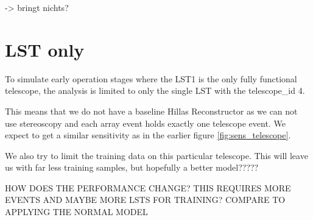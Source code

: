 -> bringt nichts?


\section{LST only}
To simulate early operation stages where the LST1 is the only fully functional 
telescope, the analysis is limited to only the single LST with 
the telescope\_id 4.

This means that we do not have a baseline Hillas Reconstructor as we can not use
stereoscopy and each array event holds exactly one telescope event.
We expect to
get a similar sensitivity as in the earlier figure \ref{fig:sens_telescope}.

We also try to limit the training data on this particular telescope.
This will leave us with far less training samples, but hopefully
a better model?????

HOW DOES THE PERFORMANCE CHANGE?
THIS REQUIRES MORE EVENTS AND MAYBE MORE LSTS FOR TRAINING?
COMPARE TO APPLYING THE NORMAL MODEL

